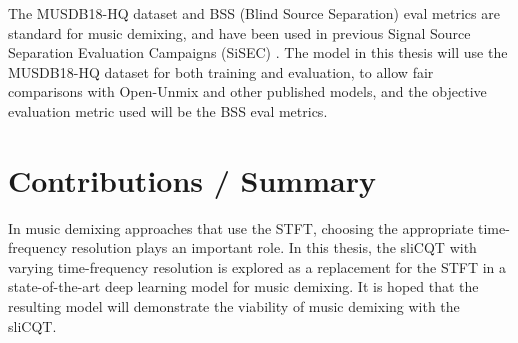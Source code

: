 \documentclass[letter,12pt]{article}
\begin{document}
The MUSDB18-HQ dataset \parencite{musdb18hq} and BSS (Blind Source Separation) eval metrics \parencite{bss} are standard for music demixing, and have been used in previous Signal Source Separation Evaluation Campaigns (SiSEC) \parencite{sisec2018}. The model in this thesis will use the MUSDB18-HQ dataset for both training and evaluation, to allow fair comparisons with Open-Unmix and other published models, and the objective evaluation metric used will be the BSS eval metrics.

\section{Contributions / Summary}

In music demixing approaches that use the STFT, choosing the appropriate time-frequency resolution plays an important role. In this thesis, the sliCQT with varying time-frequency resolution is explored as a replacement for the STFT in a state-of-the-art deep learning model for music demixing. It is hoped that the resulting model will demonstrate the viability of music demixing with the sliCQT.

\vfill
\clearpage %


\begingroup
{}
\setlength\bibitemsep{0.015em}
\printbibheading[title={References},heading=bibnumbered]
\printbibliography[heading=none]
\endgroup

\vfill
\clearpage %
\end{document}
